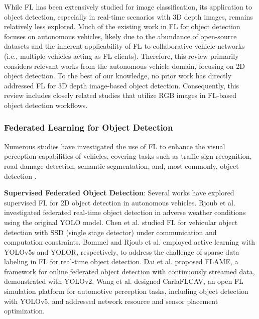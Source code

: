\documentclass[thesis]{mas_proposal}
\begin{document}
    
While FL has been extensively studied for image classification, its application to object detection, especially in real-time scenarios with 3D depth images, remains relatively less explored.  Much of the existing work in FL for object detection focuses on autonomous vehicles, likely due to the abundance of open-source datasets and the inherent applicability of FL to collaborative vehicle networks (i.e., multiple vehicles acting as FL clients). Therefore, this review primarily considers relevant works from the autonomous vehicle domain, focusing on 2D object detection. To the best of our knowledge, no prior work has directly addressed FL for 3D depth image-based object detection. Consequently, this review includes closely related studies that utilize RGB images in FL-based object detection workflows.

\subsubsection{Federated Learning for Object Detection}

\indent \indent Numerous studies have investigated the use of FL to enhance the visual perception capabilities of vehicles, covering tasks such as traffic sign recognition\cite{xie2022efficient, padaria2023traffic, lian2023traffic}, road damage detection\cite{yuan2021fedrd}, semantic segmentation\cite{fantauzzo2022feddrive}, and, most commonly, object detection \cite{wang2022federated}.

\textbf{Supervised Federated Object Detection}: Several works have explored supervised FL for 2D object detection in autonomous vehicles. Rjoub et al. \cite{rjoub2021improving} investigated federated real-time object detection in adverse weather conditions using the original YOLO model.  Chen et al. \cite{chen2020federated} studied FL for vehicular object detection with SSD (single stage detector) under communication and computation constraints. Bommel \cite{bommel2021active} and Rjoub et al. \cite{rjoub2022active} employed active learning with YOLOv5s and YOLOR, respectively, to address the challenge of sparse data labeling in FL for real-time object detection. Dai et al. \cite{dai2021flame} proposed FLAME, a framework for online federated object detection with continuously streamed data, demonstrated with YOLOv2. Wang et al. \cite{wang2022carlaflcav} designed CarlaFLCAV, an open FL simulation platform for automotive perception tasks, including object detection with YOLOv5, and addressed network resource and sensor placement optimization.
\end{document}

